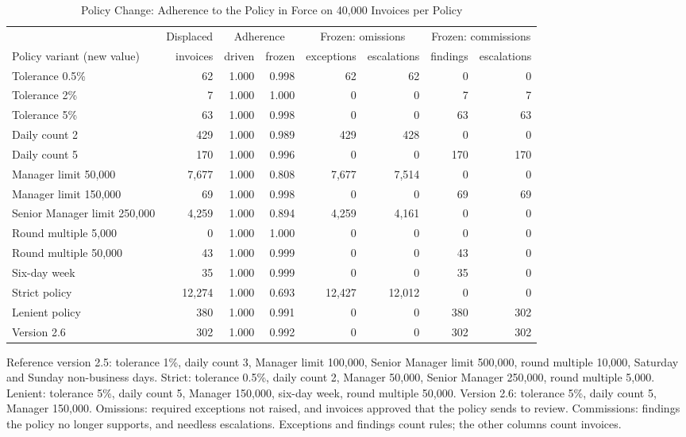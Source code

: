 \documentclass[9pt,a4paper,twocolumn]{extarticle}
\newcommand{\tablefont}{\fontsize{8}{9.5}\selectfont}
\begin{document}
\begin{table}[t]
\caption{Policy Change: Adherence to the Policy in Force on 40{,}000 Invoices per Policy}
\label{tab:drift}
\centering\tablefont\setlength{\tabcolsep}{6pt}
\begin{tabular}{lrrrrrrr}
\toprule
 & Displaced & \multicolumn{2}{c}{Adherence} & \multicolumn{2}{c}{Frozen: omissions} & \multicolumn{2}{c}{Frozen: commissions}\\
\cmidrule(lr){3-4}\cmidrule(lr){5-6}\cmidrule(lr){7-8}
Policy variant (new value) & invoices & driven & frozen & exceptions & escalations & findings & escalations\\
\midrule
Tolerance 0.5\% & 62 & 1.000 & 0.998 & 62 & 62 & 0 & 0 \\
Tolerance 2\% & 7 & 1.000 & 1.000 & 0 & 0 & 7 & 7 \\
Tolerance 5\% & 63 & 1.000 & 0.998 & 0 & 0 & 63 & 63 \\
Daily count 2 & 429 & 1.000 & 0.989 & 429 & 428 & 0 & 0 \\
Daily count 5 & 170 & 1.000 & 0.996 & 0 & 0 & 170 & 170 \\
Manager limit 50,000 & 7{,}677 & 1.000 & 0.808 & 7{,}677 & 7{,}514 & 0 & 0 \\
Manager limit 150,000 & 69 & 1.000 & 0.998 & 0 & 0 & 69 & 69 \\
Senior Manager limit 250,000 & 4{,}259 & 1.000 & 0.894 & 4{,}259 & 4{,}161 & 0 & 0 \\
Round multiple 5,000 & 0 & 1.000 & 1.000 & 0 & 0 & 0 & 0 \\
Round multiple 50,000 & 43 & 1.000 & 0.999 & 0 & 0 & 43 & 0 \\
Six-day week & 35 & 1.000 & 0.999 & 0 & 0 & 35 & 0 \\
Strict policy & 12{,}274 & 1.000 & 0.693 & 12{,}427 & 12{,}012 & 0 & 0 \\
Lenient policy & 380 & 1.000 & 0.991 & 0 & 0 & 380 & 302 \\
Version 2.6 & 302 & 1.000 & 0.992 & 0 & 0 & 302 & 302 \\
\bottomrule
\end{tabular}

\vspace{3pt}\parbox{0.92\textwidth}{\fontsize{7}{8.5}\selectfont Reference version 2.5: tolerance 1\%, daily count 3, Manager limit 100{,}000, Senior Manager limit 500{,}000, round multiple 10{,}000, Saturday and Sunday non-business days. Strict: tolerance 0.5\%, daily count 2, Manager 50,000, Senior Manager 250,000, round multiple 5,000. Lenient: tolerance 5\%, daily count 5, Manager 150,000, six-day week, round multiple 50,000. Version 2.6: tolerance 5\%, daily count 5, Manager 150,000. Omissions: required exceptions not raised, and invoices approved that the policy sends to review. Commissions: findings the policy no longer supports, and needless escalations. Exceptions and findings count rules; the other columns count invoices.}
\end{table}
\end{document}
